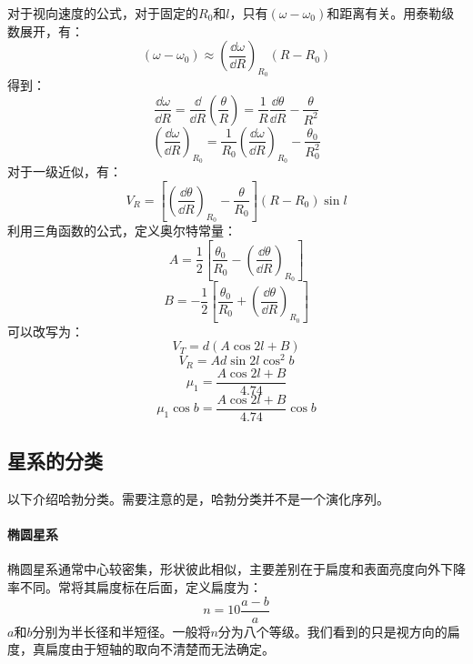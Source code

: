 对于视向速度的公式，对于固定的$R_{0}$和$l$，只有$\left(\omega-\omega_{0}\right)$和距离有关。用泰勒级数展开，有：
\begin{equation}
	\left(\omega-\omega_{0}\right)\approx \left(\frac{\dd \omega}{\dd R}\right)_{R_{0}}\left(R-R_{0}\right)
\end{equation}
得到：
\begin{equation}
	\frac{\dd \omega}{\dd R}=\frac{\dd }{\dd R}\left(\frac{\theta}{R}\right)=\frac{1}{R}\frac{\dd \theta}{\dd R}-\frac{\theta}{R^2}
\end{equation}
\begin{equation}
	\left(\frac{\dd \omega}{\dd R}\right)_{R_{0}}=\frac{1}{R_{0}}\left(\frac{\dd \omega}{\dd R}\right)_{R_{0}}-\frac{\theta_{0}}{R_{0}^2}
\end{equation}
对于一级近似，有：
\begin{equation}
	V_{R}=\left[\left(\frac{\dd \theta}{\dd R}\right)_{R_{0}}-\frac{\theta}{R_{0}}\right]\left(R-R_{0}\right)\sin l
\end{equation}
利用三角函数的公式，定义奥尔特常量：
\begin{equation}
	A=\frac{1}{2}\left[\frac{\theta_{0}}{R_{0}}-\left(\frac{\dd \theta}{\dd R}\right)_{R_{0}}\right]
\end{equation}
\begin{equation}
	B=-\frac{1}{2}\left[\frac{\theta_{0}}{R_{0}}+\left(\frac{\dd \theta}{\dd R}\right)_{R_{0}}\right]
\end{equation}
可以改写为：
\begin{equation}
	V_{T}=d\left(A\cos 2l +B\right)
\end{equation}
\begin{equation}
	V_{R}=Ad\sin 2l\cos ^2b
\end{equation}
\begin{equation}
	\mu_{1}=\frac{A\cos 2l+B}{4.74}
\end{equation}
\begin{equation}
	\mu_{1}\cos b=\frac{A\cos 2l+B}{4.74}\cos b
\end{equation}
\subsection{星系的分类}以下介绍哈勃分类。需要注意的是，哈勃分类并不是一个演化序列。
\paragraph{椭圆星系}椭圆星系通常中心较密集，形状彼此相似，主要差别在于扁度和表面亮度向外下降率不同。常将其扁度标在后面，定义扁度为：
\begin{equation}
	n=10\frac{a-b}{a}
\end{equation}
$a$和$b$分别为半长径和半短径。一般将$n$分为八个等级。我们看到的只是视方向的扁度，真扁度由于短轴的取向不清楚而无法确定。

